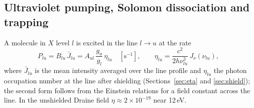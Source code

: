 \subsection{Ultraviolet pumping, Solomon dissociation and trapping}
\label{sec:pump}

A molecule in $X$ level $l$ is excited in the line $l\to u$ at the rate
\begin{equation}
  P_{lu} = B_{lu}\,\bar J_{lu} = A_{ul}\,\frac{g_u}{g_l}\,\eta_{lu}\quad[\mathrm{s^{-1}}],
  \qquad
  \eta_{lu} = \frac{c^2}{2h\nu_{lu}^3}\,J_\nu(\nu_{lu}),
  \label{eq:pump}
\end{equation}
where $\bar J_{lu}$ is the mean intensity averaged over the line profile and
$\eta_{lu}$ the photon occupation number at the line after shielding
(Sections~\ref{sec:eta} and \ref{sec:shield}); the second form follows from
the Einstein relations for a field constant across the line. In the
unshielded Draine field $\eta\approx2\times10^{-19}$ near 12\,eV.

